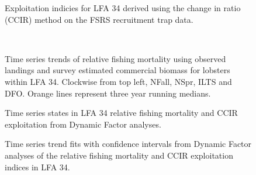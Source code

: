 \documentclass[11pt]{article}
\newcommand{\e}{/SpinDr/backup/bio_data/bio.lobster/figures/LFA3438Framework2019/} %
\begin{document}

\begin{figure}
    \centering
        \caption{Exploitation indicies for LFA 34 derived using the change in ratio (CCIR) method on the FSRS recruitment trap data.}
    \end{figure}


\begin{figure}
        \centering
    \\
        
         \caption{Time series trends of relative fishing mortality using observed landings and survey estimated commercial biomass for lobsters within LFA 34. Clockwise from top left, NFall, NSpr, ILTS and DFO. Orange lines represent three year running medians.}
        \end{figure}

   \begin{figure}
    \centering
        \caption{Time series states in LFA 34 relative fishing mortality and CCIR exploitation from Dynamic Factor analyses.}

    \end{figure}

\begin{figure}
    \centering
        \caption{Time series trend fits with confidence intervals from Dynamic Factor analyses of the relative fishing mortality and CCIR exploitation indices in LFA 34.}

    \end{figure}



    
\end{document}
